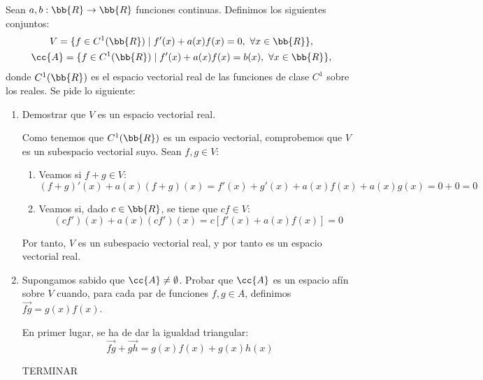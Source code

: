 \begin{ejercicio}
    Sean $a, b : \bb{R} \to \bb{R}$ funciones continuas. Definimos los siguientes conjuntos:
    \begin{gather*}
        V = \{ f \in C^1(\bb{R}) \mid f'(x) + a(x)f(x) = 0, ~\forall x \in \bb{R}\},\\
        \cc{A} = \{ f \in C^1(\bb{R}) \mid f'(x) + a(x)f(x) = b(x), ~\forall x \in \bb{R}\},
    \end{gather*}
    donde $C^1(\bb{R})$ es el espacio vectorial real de las funciones de clase $C^1$ sobre los reales. Se pide lo siguiente:
    \begin{enumerate}
        \item Demostrar que $V$ es un espacio vectorial real.

        Como tenemos que $C^1(\bb{R})$ es un espacio vectorial, comprobemos que $V$ es un subespacio vectorial suyo. Sean $f,g\in V$:
        \begin{enumerate}
            \item Veamos si $f+g\in V$:
            \begin{equation*}
                (f+g)'(x) + a(x)(f+g)(x)=f'(x)+g'(x)+a(x)f(x)+a(x)g(x)=0+0=0
            \end{equation*}
            
            \item Veamos si, dado $c\in \bb{R}$, se tiene que $cf\in V$:
            \begin{equation*}
                (cf')(x) + a(x)(cf')(x)=c[f'(x) + a(x)f(x)]=0
            \end{equation*}
        \end{enumerate}
        Por tanto, $V$ es un subespacio vectorial real, y por tanto es un espacio vectorial real.

        
        \item Supongamos sabido que $\cc{A} \neq \emptyset$. Probar que $\cc{A}$ es un espacio afín sobre $V$ cuando, para cada par de funciones $f, g \in A$, definimos $\vec{fg} = g(x)f(x)$.

        En primer lugar, se ha de dar la igualdad triangular:
        \begin{equation*}
            \vec{fg} + \vec{gh} = g(x)f(x)+g(x)h(x)
        \end{equation*}

        TERMINAR
    \end{enumerate}
\end{ejercicio}


